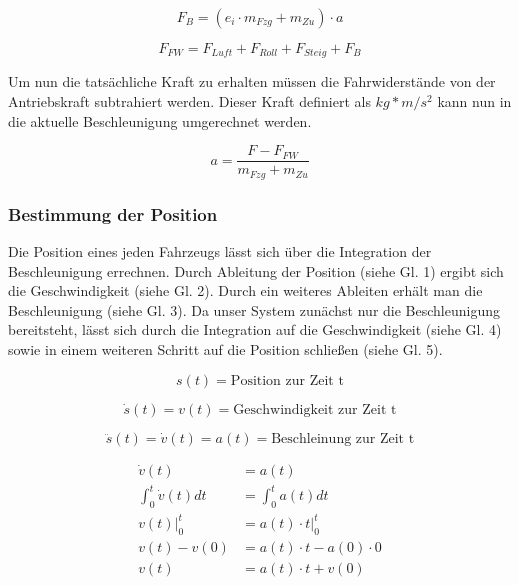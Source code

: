 \documentclass[12pt,a4paper,bibliography=totocnumbered,listof=totocnumbered, abstracton]{scrartcl}
\theoremstyle{Umgebung}
\begin{document}
\begin{equation}
 F_{B}=(e_{i}\cdot m_{Fzg} +m_{Zu}) \cdot a
\end{equation}

\begin{equation}
F_{FW} = F_{Luft} + F_{Roll} + F_{Steig} + F_{B}
\end{equation}

Um nun die tatsächliche Kraft zu erhalten müssen die Fahrwiderstände von der Antriebskraft subtrahiert werden. Dieser Kraft definiert als $kg * m/s^2$ kann nun in die aktuelle Beschleunigung umgerechnet werden.

\begin{equation}
a = \frac{F - F_{FW}}{m_{Fzg} + m_{Zu}}
\end{equation}

\subsubsection{Bestimmung der Position}

Die Position eines jeden Fahrzeugs lässt sich über die Integration der Beschleunigung errechnen. Durch Ableitung der Position (siehe Gl. 1) ergibt sich die Geschwindigkeit (siehe Gl. 2). Durch ein weiteres Ableiten erhält man die Beschleunigung (siehe Gl. 3). Da unser System zunächst nur die Beschleunigung bereitsteht, lässt sich durch die Integration auf die Geschwindigkeit (siehe Gl. 4) sowie in einem weiteren Schritt auf die Position schließen (siehe Gl. 5).

\begin{equation}
	s(t) = \text{Position zur Zeit t}
\end{equation}

\begin{equation}
	\dot{s}(t) = v(t) = \text{Geschwindigkeit zur Zeit t}
\end{equation}

\begin{equation}
	\ddot{s}(t) = \dot{v}(t) = a(t) = \text{Beschleinung zur Zeit t}
\end{equation}

\begin{equation}
	\begin{aligned}
		\dot{v}(t)                 & = a(t)                        \\
		\int_{0}^{t} \dot{v}(t) dt & = \int_{0}^{t} a(t) dt        \\
		v(t)\Big|_0^t              & = a(t) \cdot t \Big|_0^t      \\
		v(t) - v(0)                & = a(t) \cdot t - a(0) \cdot 0 \\
		v(t)                       & = a(t) \cdot t + v(0)
	\end{aligned}
\end{equation}
\end{document}

